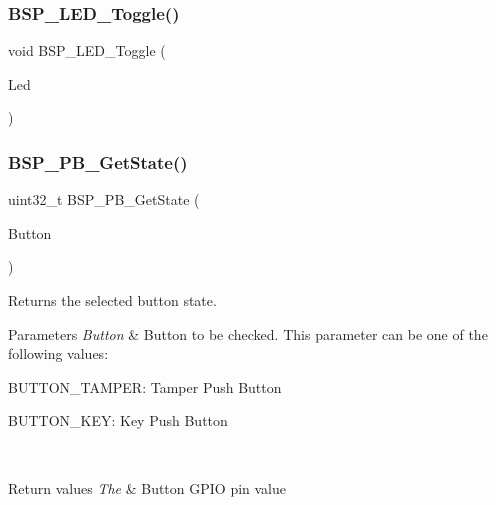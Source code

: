 \mbox{\label{group___exported___functions_ga1b9eabba7d498f41d6f16587ec0f9732}} 
\subsubsection{B\+S\+P\+\_\+\+L\+E\+D\+\_\+\+Toggle()}
{\footnotesize\ttfamily void B\+S\+P\+\_\+\+L\+E\+D\+\_\+\+Toggle (\begin{DoxyParamCaption}\item[{\textbf{ Led\+\_\+\+Type\+Def}}]{Led }\end{DoxyParamCaption})}

\mbox{\label{group___exported___functions_ga8f0978b6cffda9c67266ddfdb3a0abf7}} 
\subsubsection{B\+S\+P\+\_\+\+P\+B\+\_\+\+Get\+State()}
{\footnotesize\ttfamily uint32\+\_\+t B\+S\+P\+\_\+\+P\+B\+\_\+\+Get\+State (\begin{DoxyParamCaption}\item[{\textbf{ Button\+\_\+\+Type\+Def}}]{Button }\end{DoxyParamCaption})}



Returns the selected button state. 


\begin{DoxyParams}{Parameters}
{\em Button} & Button to be checked. This parameter can be one of the following values\+: \begin{DoxyItemize}
\item B\+U\+T\+T\+O\+N\+\_\+\+T\+A\+M\+P\+ER\+: Tamper Push Button \item B\+U\+T\+T\+O\+N\+\_\+\+K\+EY\+: Key Push Button \end{DoxyItemize}
\\
\hline
\end{DoxyParams}

\begin{DoxyRetVals}{Return values}
{\em The} & Button G\+P\+IO pin value \\
\hline
\end{DoxyRetVals}



